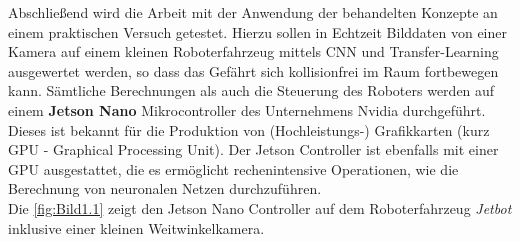 Abschließend wird die Arbeit mit der Anwendung der behandelten Konzepte an einem praktischen Versuch getestet. Hierzu sollen in Echtzeit Bilddaten von einer Kamera auf einem kleinen Roboterfahrzeug mittels CNN und Transfer-Learning ausgewertet werden, so dass das Gefährt sich kollisionfrei im Raum fortbewegen kann. Sämtliche Berechnungen als auch die Steuerung des Roboters werden auf einem \textbf{Jetson Nano} Mikrocontroller des Unternehmens Nvidia durchgeführt. Dieses ist bekannt für die Produktion von (Hochleistungs-) Grafikkarten (kurz GPU - Graphical Processing Unit). Der Jetson Controller ist ebenfalls mit einer GPU ausgestattet, die es ermöglicht rechenintensive Operationen, wie \zB die Berechnung von neuronalen Netzen durchzuführen. \\
Die \autoref{fig:Bild1.1} zeigt den Jetson Nano Controller auf dem Roboterfahrzeug \textit{\glqq Jetbot\grqq{}} inklusive einer kleinen Weitwinkelkamera.
